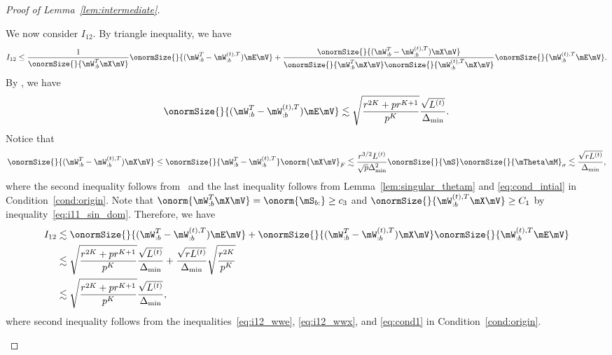 \documentclass[lettersize,onecolumn,journal]{IEEEtran}
\theoremstyle{definition}
\theoremstyle{definition}
\begin{document}
\begin{proof}[Proof of Lemma~\ref{lem:intermediate}]
\begin{enumerate}[wide]
    
    
    We now consider $I_{12}$. By triangle inequality, we have 
    \begin{equation}
        I_{12} \leq \frac{1}{\onormSize{}{  \mW_{:b}^T \mX \mV }}\onormSize{}{ (\mW_{:b}^T - \mW_{:b}^{(t),T}) \mE \mV } + \frac{ \onormSize{}{(\mW_{:b}^T - \mW_{:b}^{(t),T}) \mX \mV} }{\onormSize{}{  \mW_{:b}^T \mX \mV } \onormSize{}{  \mW_{:b}^{(t),T} \mX \mV } }\onormSize{}{ \mW_{:b}^{(t),T} \mE \mV}.
    \end{equation}
    By \citet[Proof of Lemma 5]{han2020exact}, we have 
    \begin{equation}\label{eq:i12_wwe}
        \onormSize{}{ (\mW_{:b}^T - \mW_{:b}^{(t),T}) \mE \mV }  \lesssim \sqrt{\frac{ r^{2K} + p r^{K+1}}{p^K}} \frac{\sqrt{L^{(t)}}}{\Delta_{\min}}.
    \end{equation}
    Notice that 
    \begin{equation}\label{eq:i12_wwx}
        \onormSize{}{(\mW_{:b}^T - \mW_{:b}^{(t),T}) \mX \mV} \leq \onormSize{}{\mW_{:b}^T - \mW_{:b}^{(t),T}} \onorm{\mX\mV}_F \lesssim \frac{r^{3/2}L^{(t)}}{\sqrt{p}\Delta_{\min}^2} \onormSize{}{\mS} \onormSize{}{\mTheta \mM}_{\sigma} \lesssim \frac{ \sqrt{r L^{(t)}} }{\Delta_{\min}}, 
    \end{equation}
    where the second inequality follows from~\citet[Inequality (121), Proof of Lemma 5]{han2020exact} and the last inequality follows from Lemma~\ref{lem:singular_thetam} and \eqref{eq:cond_intial} in Condition~\ref{cond:origin}.
     Note that $\onorm{\mW_{:b}^T \mX \mV} = \onorm{\mS_{b:}} \geq c_3$ and $\onormSize{}{  \mW_{:b}^{(t),T} \mX \mV } \geq C_1$ by inequality~\eqref{eq:i11_sin_dom}. Therefore, we have 
     \begin{align}
         I_{12} &\lesssim  \onormSize{}{ (\mW_{:b}^T - \mW_{:b}^{(t),T}) \mE \mV }  +   \onormSize{}{(\mW_{:b}^T - \mW_{:b}^{(t),T}) \mX \mV}   \onormSize{}{ \mW_{:b}^{(t),T} \mE \mV} \\
         &\lesssim \sqrt{\frac{ r^{2K} + p r^{K+1}}{p^K}} \frac{\sqrt{L^{(t)}}}{\Delta_{\min}} + \frac{ \sqrt{r L^{(t)}} }{\Delta_{\min}}\sqrt{\frac{r^{2K}}{p^K}} \\
         & \lesssim \sqrt{\frac{ r^{2K} + p r^{K+1}}{p^K}} \frac{\sqrt{L^{(t)}}}{\Delta_{\min}},\label{eq:i12}
     \end{align}
     where second inequality follows from the inequalities~\eqref{eq:i12_wwe}, \eqref{eq:i12_wwx}, and \eqref{eq:cond1} in Condition~\ref{cond:origin}.
     

\end{enumerate}
\end{proof}
\end{document}
